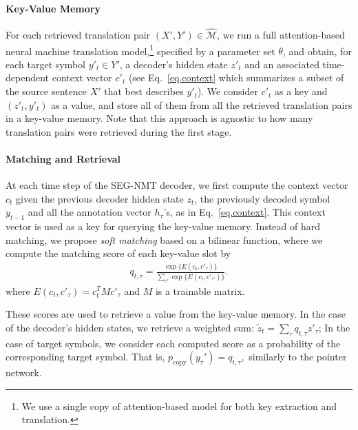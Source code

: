 \vspace{-7pt}
\paragraph{Key-Value Memory}

For each retrieved translation pair $(X', Y') \in \hat{\mathcal{M}}$, we run a full attention-based neural machine translation model,\footnote{
We use a single copy of attention-based model for both key extraction and translation.
}
specified by a parameter set $\theta$, and obtain, for each target symbol $y'_t \in Y'$, a decoder's hidden state $z'_t$ and an associated time-dependent context vector $c'_t$ (see Eq.~\eqref{eq.context} which summarizes a subset of the source sentence $X'$ that best describes $y'_t$). We consider $c'_t$ as a key and $(z'_t, y'_t)$ as a value, and store all of them from all the retrieved translation pairs in a key-value memory. Note that this approach is agnostic to how many translation pairs were retrieved during the first stage.


\vspace{-7pt}
\paragraph{Matching and Retrieval}

At each time step of the SEG-NMT decoder, we first compute the context vector $c_t$ given the previous decoder hidden state $z_t$, the previously decoded symbol $y_{t-1}$ and all the annotation vector $h_{\tau}$'s, as in Eq.~\eqref{eq.context}. This context vector is used as a key for querying the key-value memory. Instead of hard matching, we propose {\it soft matching} based on a bilinear function, where we compute the matching score of each key-value slot by
\begin{align}
\label{eq.score}
    q_{t, \tau}  = \frac{\exp\{E(c_t, c'_\tau)\}}{\sum_{\tau'} \exp\{E(c_t, c'_{\tau'})\}}.
\end{align}
where $E(c_t, c'_\tau) = c_t^TMc'_\tau$ and $M$ is a trainable matrix. 

These scores are used to retrieve a value from the key-value memory. In the case of the decoder's hidden states, we retrieve a weighted sum:
$\tilde{z}_t = \sum_{\tau} q_{t, \tau} z'_{\tau}$;
In the case of target symbols, we consider each computed score as a probability of the corresponding target symbol. That is,
$p_{\text{copy}}(y_{\tau}') = q_{t, \tau},$ similarly to the pointer network\citep{vinyals2015pointer}.

